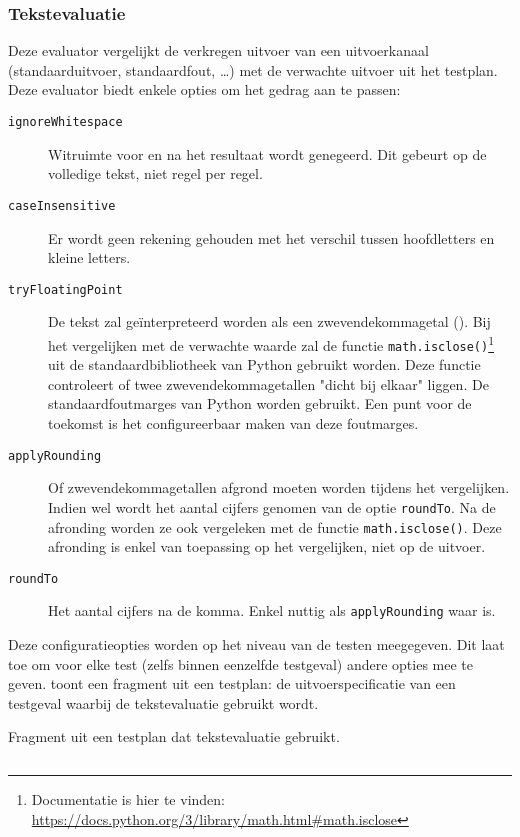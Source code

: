 \subsubsection{Tekstevaluatie}

Deze evaluator vergelijkt de verkregen uitvoer van een uitvoerkanaal (standaarduitvoer, standaardfout, \ldots) met de verwachte uitvoer uit het testplan.
Deze evaluator biedt enkele opties om het gedrag aan te passen:

\begin{description}
    \item[\texttt{ignoreWhitespace}]
    Witruimte voor en na het resultaat wordt genegeerd.
    Dit gebeurt op de volledige tekst, niet regel per regel.
    \item[\texttt{caseInsensitive}] Er wordt geen rekening gehouden met het verschil tussen hoofdletters en kleine letters.
    \item[\texttt{tryFloatingPoint}]
    De tekst zal geïnterpreteerd worden als een zwevendekommagetal ().
    Bij het vergelijken met de verwachte waarde zal de functie \texttt{math.isclose()}\footnote{Documentatie is hier te vinden: \url{https://docs.python.org/3/library/math.html\#math.isclose}} uit de standaardbibliotheek van Python gebruikt worden.
    Deze functie controleert of twee zwevendekommagetallen "dicht bij elkaar" liggen.
    De standaardfoutmarges van Python worden gebruikt.
    Een punt voor de toekomst is het configureerbaar maken van deze foutmarges.
    \item[\texttt{applyRounding}] Of zwevendekommagetallen afgrond moeten worden tijdens het vergelijken.
    Indien wel wordt het aantal cijfers genomen van de optie \texttt{roundTo}.
    Na de afronding worden ze ook vergeleken met de functie \texttt{math.isclose()}.
    Deze afronding is enkel van toepassing op het vergelijken, niet op de uitvoer.
    \item[\texttt{roundTo}] Het aantal cijfers na de komma.
    Enkel nuttig als \texttt{applyRounding} waar is.
\end{description}

Deze configuratieopties worden op het niveau van de testen meegegeven.
Dit laat toe om voor elke test (zelfs binnen eenzelfde testgeval) andere opties mee te geven.
 toont een fragment uit een testplan: de uitvoerspecificatie van een testgeval waarbij de tekstevaluatie gebruikt wordt.

\begin{listing}
    \caption{Fragment uit een testplan dat tekstevaluatie gebruikt.}
    \label{lst:testplan-text}
    \inputminted[breaklines]{json}{code/testplan-text.json}
\end{listing}

